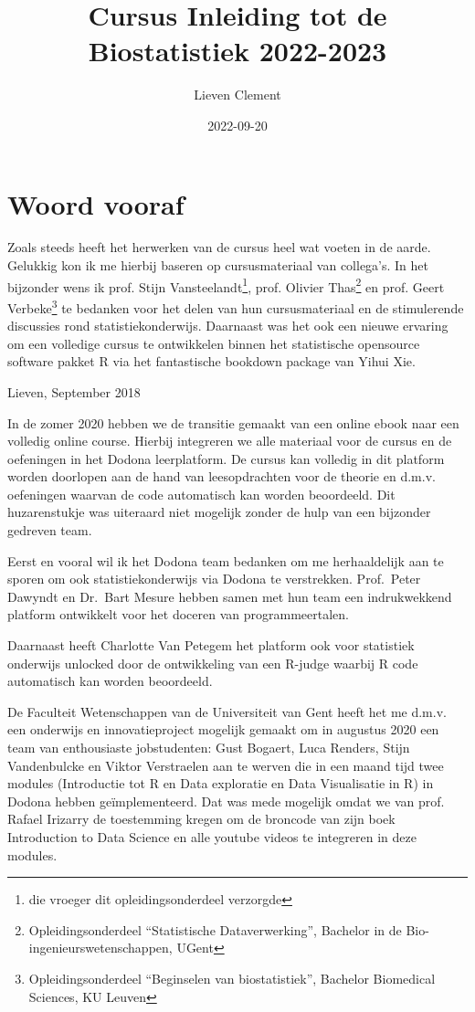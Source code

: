 \documentclass[
  12pt,dutch,coursenotes]{book}
\title{Cursus Inleiding tot de Biostatistiek 2022-2023}
\author{Lieven Clement}
\date{2022-09-20}
\begin{document}
\maketitle

{
\setcounter{tocdepth}{1}
\tableofcontents
}
\hypertarget{woord-vooraf}{%
\chapter*{Woord vooraf}\label{woord-vooraf}}

Zoals steeds heeft het herwerken van de cursus heel wat voeten in de aarde. Gelukkig kon ik me hierbij baseren op cursusmateriaal van collega's. In het bijzonder wens ik prof. Stijn Vansteelandt\footnote{die vroeger dit opleidingsonderdeel verzorgde}, prof. Olivier Thas\footnote{Opleidingsonderdeel ``Statistische Dataverwerking'', Bachelor in de Bio-ingenieurswetenschappen, UGent} en prof. Geert Verbeke\footnote{Opleidingsonderdeel ``Beginselen van biostatistiek'', Bachelor Biomedical Sciences, KU Leuven} te bedanken voor het delen van hun cursusmateriaal en de stimulerende discussies rond statistiekonderwijs. Daarnaast was het ook een nieuwe ervaring om een volledige cursus te ontwikkelen binnen het statistische opensource software pakket R via het fantastische bookdown package van Yihui Xie.

Lieven, September 2018

In de zomer 2020 hebben we de transitie gemaakt van een online ebook naar een volledig online course.
Hierbij integreren we alle materiaal voor de cursus en de oefeningen in het Dodona leerplatform.
De cursus kan volledig in dit platform worden doorlopen aan de hand van leesopdrachten voor de theorie en d.m.v. oefeningen waarvan de code automatisch kan worden beoordeeld.
Dit huzarenstukje was uiteraard niet mogelijk zonder de hulp van een bijzonder gedreven team.

Eerst en vooral wil ik het Dodona team bedanken om me herhaaldelijk aan te sporen om ook statistiekonderwijs via Dodona te verstrekken. Prof.~Peter Dawyndt en Dr.~Bart Mesure hebben samen met hun team een indrukwekkend platform ontwikkelt voor het doceren van programmeertalen.

Daarnaast heeft Charlotte Van Petegem het platform ook voor statistiek onderwijs unlocked door de ontwikkeling van een R-judge waarbij R code automatisch kan worden beoordeeld.

De Faculteit Wetenschappen van de Universiteit van Gent heeft het me d.m.v. een onderwijs en innovatieproject mogelijk gemaakt om in augustus 2020 een team van enthousiaste jobstudenten: Gust Bogaert, Luca Renders, Stijn Vandenbulcke en Viktor Verstraelen aan te werven die in een maand tijd twee modules (Introductie tot R en Data exploratie en Data Visualisatie in R) in Dodona hebben geïmplementeerd. Dat was mede mogelijk omdat we van prof. Rafael Irizarry de toestemming kregen om de broncode van zijn boek Introduction to Data Science en alle youtube videos te integreren in deze modules.
\end{document}
